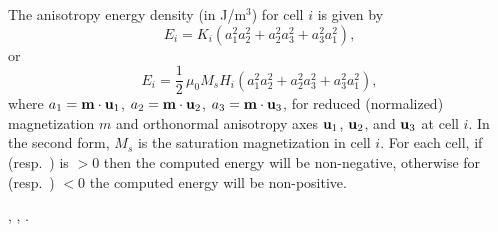 \begin{description}
  The anisotropy energy density (in J/m${}^3$) for cell $i$ is given by
   \begin{displaymath}
         E_i = K_i\left(a_1^2a_2^2 + a_2^2a_3^2 + a_3^2a_1^2\right),
   \end{displaymath}
   or
   \begin{displaymath}
         E_i = \frac{1}{2}\, \mu_0 M_s H_i
         \left(a_1^2a_2^2 + a_2^2a_3^2 + a_3^2a_1^2\right),
   \end{displaymath}
  where $a_1 = \textbf{m}\cdot\textbf{u}_1$, $a_2 = \textbf{m}\cdot\textbf{u}_2$, $a_3 =
  \textbf{m}\cdot\textbf{u}_3$, for reduced (normalized) magnetization $m$ and
  orthonormal anisotropy axes $\textbf{u}_1$, $\textbf{u}_2$, and $\textbf{u}_3$ at cell $i$.
  In the second form, $M_s$ is the saturation magnetization in cell $i$.
  For each cell, if  (resp.\ ) is $>$0 then
  the computed energy will be non-negative, otherwise for 
  (resp.\ ) $<$0 the computed energy will be non-positive.

\begin{ExampleMifs}
 , , .
\end{ExampleMifs}

\end{description}

